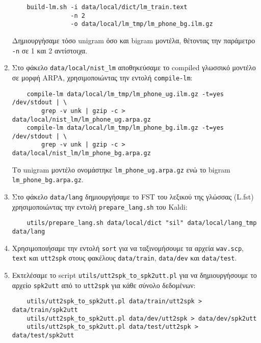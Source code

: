 \documentclass[a4paper,12pt]{article}
\begin{document}
\begin{enumerate}
\begin{lstlisting}
    build-lm.sh -i data/local/dict/lm_train.text 
                -n 2 
                -o data/local/lm_tmp/lm_phone_bg.ilm.gz
    \end{lstlisting}
    
    Δημιουργήσαμε τόσο unigram όσο και bigram μοντέλα, θέτοντας την παράμετρο \verb|-n| σε 1 και 2 αντίστοιχα.
    
    \item Στο φάκελο \verb|data/local/nist_lm| αποθηκεύσαμε το compiled γλωσσικό μοντέλο σε μορφή ARPA, χρησιμοποιώντας την εντολή \verb|compile-lm|:

    \begin{lstlisting}
    compile-lm data/local/lm_tmp/lm_phone_ug.ilm.gz -t=yes /dev/stdout | \
        grep -v unk | gzip -c > data/local/nist_lm/lm_phone_ug.arpa.gz
    compile-lm data/local/lm_tmp/lm_phone_bg.ilm.gz -t=yes /dev/stdout | \
        grep -v unk | gzip -c > data/local/nist_lm/lm_phone_bg.arpa.gz
    \end{lstlisting}
        
    Το unigram μοντέλο ονομάστηκε \verb|lm_phone_ug.arpa.gz| ενώ το bigram \verb|lm_phone_bg.arpa.gz|.
    
    \item Στο φάκελο \verb|data/lang| δημιουργήσαμε το FST του λεξικού της γλώσσας (L.fst) χρησιμοποιώντας την εντολή \verb|prepare_lang.sh| του Kaldi:
    
    \begin{lstlisting}
    utils/prepare_lang.sh data/local/dict "sil" data/local/lang_tmp data/lang
    \end{lstlisting}
    
    \item Χρησιμοποιήσαμε την εντολή \verb|sort| για να ταξινομήσουμε τα αρχεία \verb|wav.scp|, \verb|text| και \verb|utt2spk| στους φακέλους \verb|data/train|, \verb|data/dev| και \verb|data/test|.
    
    \item Εκτελέσαμε το script \verb|utils/utt2spk_to_spk2utt.pl| για να δημιουργήσουμε το αρχείο \verb|spk2utt| από το \verb|utt2spk| για κάθε σύνολο δεδομένων:
    \begin{lstlisting}
    utils/utt2spk_to_spk2utt.pl data/train/utt2spk > data/train/spk2utt
    utils/utt2spk_to_spk2utt.pl data/dev/utt2spk > data/dev/spk2utt
    utils/utt2spk_to_spk2utt.pl data/test/utt2spk > data/test/spk2utt
    \end{lstlisting}
        

\end{enumerate}
\end{document}
